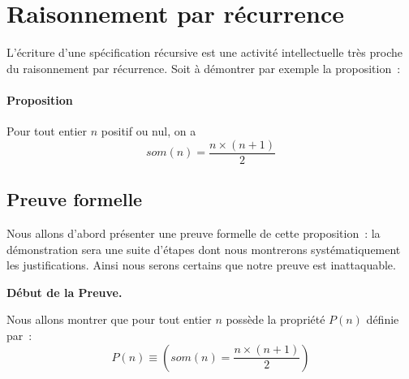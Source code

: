 \section{Raisonnement par récurrence}

L'écriture d'une spécification récursive est une activité
intellectuelle très proche du raisonnement par récurrence. Soit à
démontrer par exemple la proposition~:

\paragraph*{Proposition}
	Pour tout entier $n$ positif ou nul,  on a  
$$som(n)= \frac{n\times(n+1)}{2}$$


\subsection{Preuve formelle}

Nous allons d'abord présenter une preuve formelle de cette
proposition~: la démonstration sera une suite d'étapes dont nous
montrerons systématiquement les justifications. Ainsi nous serons
certains que notre preuve est inattaquable.


\textbf{Début de la Preuve.}

Nous allons montrer que pour tout entier $n$ possède la
propriété  $P(n)$  définie par~: 
$$P(n) \equiv  \left( som(n)=\frac{n\times(n+1)}{2} \right)$$

